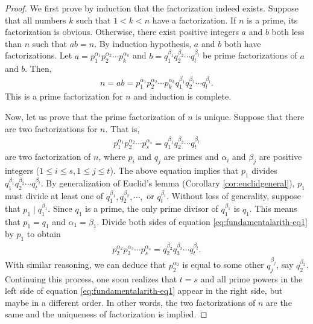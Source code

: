 \documentclass{subfile}
\begin{document}
	\begin{proof}
		We first prove by induction that the factorization indeed exists. Suppose that all numbers $k$ such that $1<k<n$ have a factorization. If $n$ is a prime, its factorization is obvious. Otherwise, there exist positive integers $a$ and $b$ both less than $n$ such that $ab=n$. By induction hypothesis, $a$ and $b$ both have factorizations. Let $a=p_1^{\alpha_1}p_2^{\alpha_2}\cdots p_k^{\alpha_k}$ and $b=q_1^{\beta_1}q_2^{\beta_2}\cdots q_l^{\beta_l}$ be prime factorizations of $a$ and $b$. Then,
		\begin{align*}
			n = ab = p_1^{\alpha_1}p_2^{\alpha_2}\cdots p_k^{\alpha_k}q_1^{\beta_1}q_2^{\beta_2}\cdots q_l^{\beta_l}.
		\end{align*}
		This is a prime factorization for $n$ and induction is complete.

		Now, let us prove that the prime factorization of $n$ is unique. Suppose that there are two factorizations for $n$. That is,
		\begin{align}
			p_1^{\alpha_1}p_2^{\alpha_2}\cdots p_s^{\alpha_s}=q_1^{\beta_1}q_2^{\beta_2}\cdots q_t^{\beta_t} \label{eq:fundamentalarith-eq1}
		\end{align}
		are two factorization of $n$, where $p_i$ and $q_j$ are primes and $\alpha_i$ and $\beta_j$ are positive integers ($1 \leq i \leq s, 1 \leq j \leq t$). The above equation implies that $p_1$ divides $q_1^{\beta_1}q_2^{\beta_2}\cdots q_t^{\beta_t}$. By generalization of Euclid's lemma (Corollary \eqref{cor:euclidgeneral}), $p_1$ must divide at least one of $q_1^{\beta_1},q_2^{\beta_2},\cdots ,$ or $q_t^{\beta_t}$. Without loss of generality, suppose that $p_1\mid q_1^{\beta_1}$. Since $q_1$ is a prime, the only prime divisor of $q_1^{\beta_1}$ is $q_1$. This means that $p_1=q_1$ and $\alpha_1=\beta_1$. Divide both sides of equation \eqref{eq:fundamentalarith-eq1} by $p_1$ to obtain
		\begin{align*}
			p_2^{\alpha_2}p_3^{\alpha_3}\cdots p_s^{\alpha_s}=q_2^{\beta_2}q_3^{\beta_3}\cdots q_t^{\beta_t}.
		\end{align*}
		With similar reasoning, we can deduce that $p_2^{\alpha_2}$ is equal to some other $q_j^{\beta_j}$, say $q_{2}^{\beta_2}$. Continuing this process, one soon realizes that $t=s$ and all prime powers in the left side of equation \eqref{eq:fundamentalarith-eq1} appear in the right side, but maybe in a different order. In other words, the two factorizations of $n$ are the same and the uniqueness of factorization is implied.
	\end{proof}
\end{document}
